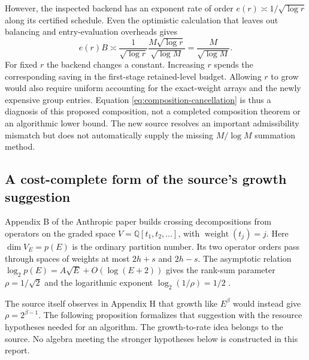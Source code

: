However, the inspected backend has an exponent rate of order
$e(r)\asymp1/\sqrt{\log r}$ along its certified schedule.  Even the
optimistic calculation that leaves out balancing and entry-evaluation
overheads gives
\begin{equation}
 e(r)B\asymp
 \frac1{\sqrt{\log r}}
 \frac{M\sqrt{\log r}}{\sqrt{\log M}}
 =\frac{M}{\sqrt{\log M}}.
 \label{eq:composition-cancellation}
\end{equation}
For fixed $r$ the backend changes a constant.  Increasing $r$ spends
the corresponding saving in the first-stage retained-level budget.
Allowing $r$ to grow would also require uniform accounting for the
exact-weight arrays and the newly expensive group entries.  Equation
\eqref{eq:composition-cancellation} is thus a diagnosis of this proposed
composition, not a completed composition theorem or an algorithmic lower
bound.  The new source resolves an important admissibility mismatch but
does not automatically supply the missing $M/\log M$ summation method.

\subsection{A cost-complete form of the source's growth suggestion}

Appendix B of the Anthropic paper builds crossing decompositions from
operators on the graded space
$V=\mathbb Q[t_1,t_2,\ldots]$, with $\operatorname{weight}(t_j)=j$.
Here $\dim V_E=p(E)$ is the ordinary partition number.  Its two operator
orders pass through spaces of weights at most $2h+s$ and $2h-s$.
The asymptotic relation $\log_2p(E)=A\sqrt E+O(\log(E+2))$ gives the
rank-sum parameter $\rho=1/\sqrt2$ and the logarithmic exponent
$\log_2(1/\rho)=1/2$ \cite[Appendices A and B]{anthropic}.

The source itself observes in Appendix H that growth like $E^\beta$
would instead give $\rho=2^{\beta-1}$.  The following proposition
formalizes that suggestion with the resource hypotheses needed for an
algorithm.  The growth-to-rate idea belongs to the source.  No algebra
meeting the stronger hypotheses below is constructed in this report.

